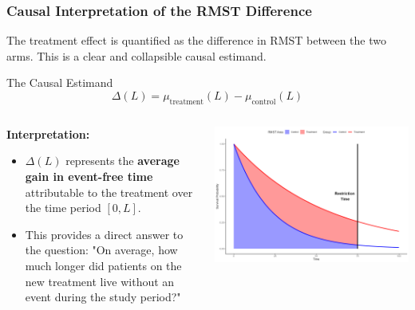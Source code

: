 \documentclass{beamer}
\begin{document}
\begin{frame}
\frametitle{Causal Interpretation of the RMST Difference}
The treatment effect is quantified as the difference in RMST between the two arms. This is a clear and collapsible causal estimand.

\begin{block}{The Causal Estimand}
$$\Delta(L) = \mu_{\text{treatment}}(L) - \mu_{\text{control}}(L)$$
\end{block}

\begin{columns}
\begin{column}{0.5\textwidth}
\textbf{Interpretation:}
\begin{itemize}
    \item $\Delta(L)$ represents the \textbf{average gain in event-free time} attributable to the treatment over the time period $[0, L]$.
    \item This provides a direct answer to the question: "On average, how much longer did patients on the new treatment live without an event during the study period?"
\end{itemize}
\end{column}
\begin{column}{0.5\textwidth}
\includegraphics[width=\textwidth]{images/rmst_causal_plot.png}
\end{column}
\end{columns}
\end{frame}
\end{document}
